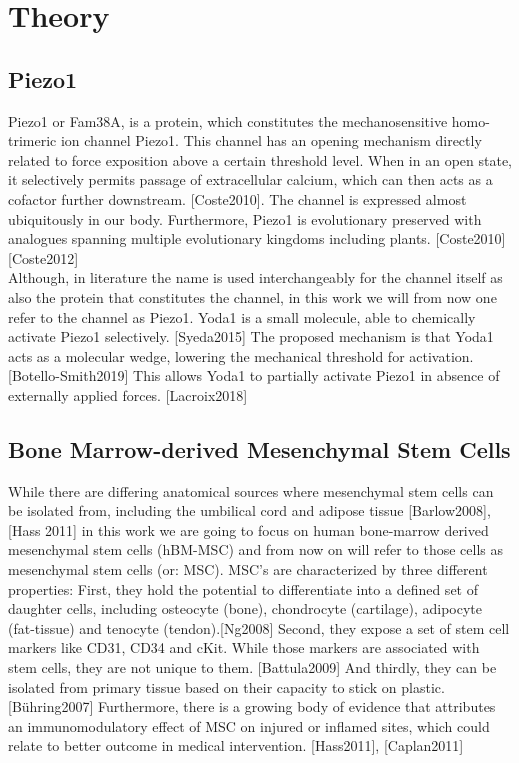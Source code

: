\section{Theory}

\subsection{Piezo1}


Piezo1 or Fam38A, is a protein, which constitutes the mechanosensitive homo-trimeric ion channel Piezo1. This channel has an opening mechanism directly related to force exposition above a certain threshold level. When in an open state, it selectively permits passage of extracellular calcium, which can then acts as a cofactor further downstream. [Coste2010]. The channel is expressed almost ubiquitously in our body. Furthermore, Piezo1 is evolutionary preserved with analogues spanning multiple evolutionary kingdoms including plants. [Coste2010][Coste2012]\\
Although, in literature the name \Piezo{} is used interchangeably for the channel itself as also the protein that constitutes the channel, in this work we will from now one refer to the channel as Piezo1.
Yoda1 is a small molecule, able to chemically activate Piezo1 selectively. [Syeda2015] The proposed mechanism is that Yoda1 acts as a molecular wedge, lowering the mechanical threshold for activation. [Botello-Smith2019] This allows Yoda1 to partially activate Piezo1 in absence of externally applied forces. [Lacroix2018]

\subsection{Bone Marrow-derived Mesenchymal Stem Cells}
While there are differing anatomical sources where mesenchymal stem cells can be isolated from, including the umbilical cord and adipose tissue [Barlow2008], [Hass 2011] in this work we are going to focus on human bone-marrow derived mesenchymal stem cells (hBM-MSC) and from now on will refer to those cells as mesenchymal stem cells (or: MSC). \hfill \newline 
MSC's are characterized by three different properties: First, they hold the potential to differentiate into a defined set of daughter cells, including osteocyte (bone), chondrocyte (cartilage), adipocyte (fat-tissue) and tenocyte (tendon).[Ng2008] Second, they expose a set of stem cell markers like CD31, CD34 and cKit. While those markers are associated with stem cells, they are not unique to them. [Battula2009] And thirdly, they can be isolated from primary tissue based on their capacity to stick on plastic. [Bühring2007] Furthermore, there is a growing body of evidence that attributes an immunomodulatory effect of MSC on injured or inflamed sites, which could relate to better outcome in medical intervention. [Hass2011], [Caplan2011]

